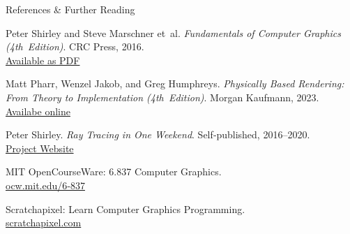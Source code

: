 \begin{frame}{References \& Further Reading}
  \footnotesize
  \begin{thebibliography}{9}
    Peter Shirley and Steve Marschner et~al.
    \textit{Fundamentals of Computer Graphics (4th Edition)}.
    CRC Press, 2016.\\
    \href{http://repo.darmajaya.ac.id/5422/}{Available as PDF}

    Matt Pharr, Wenzel Jakob, and Greg Humphreys.
    \textit{Physically Based Rendering: From Theory to Implementation (4th Edition)}.
    Morgan Kaufmann, 2023.\\
    \href{https://pbr-book.org/4ed/contents}{Availabe online}

    Peter Shirley.
    \textit{Ray Tracing in One Weekend}.
    Self‑published, 2016–2020.\\
    \href{https://raytracing.github.io/}{Project Website}

    MIT OpenCourseWare: 6.837 Computer Graphics.\\
    \href{https://ocw.mit.edu/courses/6-837-computer-graphics-fall-2012/}{ocw.mit.edu/6‑837}

    Scratchapixel: Learn Computer Graphics Programming.\\
    \href{https://www.scratchapixel.com/}{scratchapixel.com}
  \end{thebibliography}
\end{frame}
